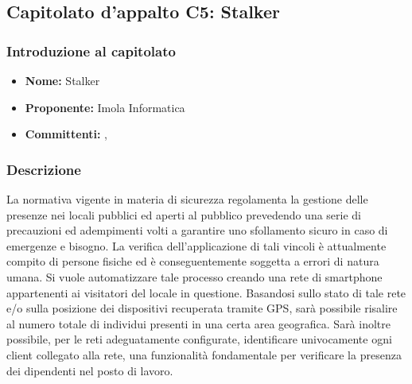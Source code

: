 \subsection{Capitolato d'appalto C5: Stalker}
	\subsubsection{Introduzione al capitolato}
	\begin{itemize}
		\item \textbf{Nome:} Stalker
		\item \textbf{Proponente:} Imola Informatica
		\item \textbf{Committenti:} \TV, \RC
	\end{itemize}
	
	\subsubsection{Descrizione}
	La normativa vigente in materia di sicurezza regolamenta la gestione delle presenze nei locali pubblici ed aperti al pubblico prevedendo una serie di precauzioni ed adempimenti volti a garantire uno sfollamento sicuro in caso di emergenze e bisogno. La verifica dell'applicazione di tali vincoli è attualmente compito di persone fisiche ed è conseguentemente soggetta a errori di natura umana.
	Si vuole automatizzare tale processo creando una rete di smartphone appartenenti ai visitatori del locale in questione. Basandosi sullo stato di tale rete e/o sulla posizione dei dispositivi recuperata tramite GPS, sarà possibile risalire al numero totale di individui presenti in una certa area geografica. Sarà inoltre possibile, per le reti adeguatamente configurate, identificare univocamente ogni client collegato alla rete, una funzionalità fondamentale per verificare la presenza dei dipendenti nel posto di lavoro.
	
